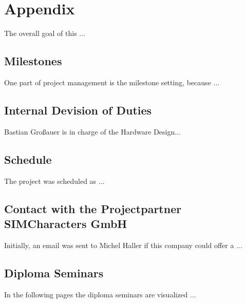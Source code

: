\documentclass[12pt]{article}
\begin{document}

\clearpage




\section{Appendix}

The overall goal of this ...


\subsection{Milestones}

One part of project management is the milestone setting, because ...


\subsection{Internal Devision of Duties}

Bastian Großauer is in charge of the Hardware Design...

\subsection{Schedule}

The project was scheduled as ...


\subsection{Contact with the Projectpartner SIMCharacters GmbH}

Initially, an email was sent to Michel Haller if this company could offer a ...


\subsection{Diploma Seminars}

In the following pages the diploma seminars are visualized ...


\clearpage
\end{document}
